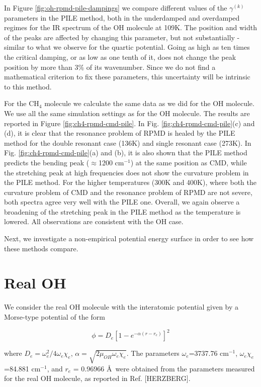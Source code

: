 \documentclass[aps,prb,superscriptaddress,amsmath,amssymb,showpacs,twocolumn]{revtex4}
\begin{document}
In Figure \ref{fig:oh-rpmd-pile-dampings} we compare different values of the $\gamma^{(k)}$ parameters in the PILE method,
both in the underdamped and overdamped regimes for the IR spectrum of the OH molecule at 109K. The position
and width of the peaks are affected by changing this parameter, but not substantially - similar to what
we observe for the quartic potential. Going as high as ten times the critical damping, or as low
as one tenth of it, does not change the peak position by more than 3\% of its wavenumber. Since we do not
find a mathematical criterion to fix these parameters, this uncertainty will be intrinsic to this method.

For the CH$_4$ molecule we calculate the same data as we did for the OH molecule. We use all
the same simulation settings as for the OH molecule. The results are reported
in Figure \ref{fig:ch4-rpmd-cmd-pile}. In Fig. \ref{fig:ch4-rpmd-cmd-pile}(c) and (d), it is clear that the resonance
problem of RPMD is healed by the PILE method for the double resonant case (136K) and single resonant case (273K). 
In Fig. \ref{fig:ch4-rpmd-cmd-pile}(a) and (b), it is also shown that the PILE method predicts
the bending peak ($\approx$1200 cm$^{-1}$) at the same position as CMD, while the stretching peak
at high frequencies does not show the curvature problem in the PILE method. 
For the higher temperatures (300K and 400K),
where both the curvature problem of CMD and the resonance problem of RPMD are not severe, both spectra
agree very well with the PILE one. Overall, we again observe a broadening 
of the stretching peak in the PILE method as the temperature is lowered. All observations are consistent with the OH case.

Next, we investigate a non-empirical potential energy surface in order to see
how these methods compare.


\section{Real OH}

We consider the real OH molecule with the interatomic potential given by a Morse-type potential of the form

\begin{equation}
\phi = D_{e} \left[ 1-e^{-\alpha(r-r_{e})}\right]^2 
\end{equation}

\noindent where $D_{e} = \omega_e^2/4\omega_e\chi_e$, $\alpha=\sqrt{2\mu_{OH}\omega_e\chi_e}$. The parameters $\omega_e$=3737.76 cm$^{-1}$, $\omega_e \chi_e$=84.881 cm$^{-1}$, and $r_{e}$ = 0.96966 \AA\, were obtained from the parameters measured for the real OH molecule, as reported in Ref. [HERZBERG].
\end{document}
